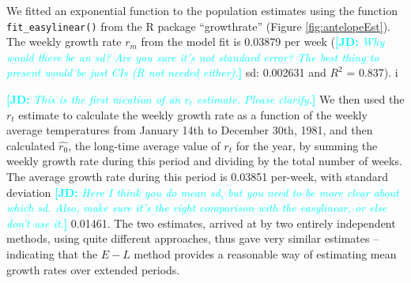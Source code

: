 \documentclass[12pt,a4paper]{article}
\newcommand{\comment}[3]{\textcolor{#1}{\textbf{[#2: }\textsl{#3}\textbf{]}}}
\newcommand{\jd}[1]{\comment{cyan}{JD}{#1}}
\begin{document}
We fitted an exponential function to the population estimates using the function \texttt{fit\_easylinear()} from the R package “growthrate” (Figure \ref{fig:antelopeEst}). The weekly growth rate $r_m$ from the model fit is 0.03879 per week (\jd{Why would there be an sd? Are you sure it's not standard error? The best thing to present would be just CIs (R not needed either).} sd: 0.002631 and $R^2$ = 0.837). i

\jd{This is the first mention of an $r_t$ estimate. Please clarify.}
We then used the $r_t$ estimate to calculate the weekly growth rate as a function of the weekly average temperatures from January 14th to December 30th, 1981, and then calculated $\hat{r_0}$, the long-time average value of $r_t$ for the year, by summing the weekly growth rate during this period and dividing by the total number of weeks. The average growth rate during this period is 0.03851 per-week, with standard deviation \jd{Here I think you do mean sd, but you need to be more clear about which sd. Also, make sure it's the right comparison with the easylinear, or else don't use it.} 0.01461. The two estimates, arrived at by two entirely independent methods, using quite different approaches, thus gave very similar estimates – indicating that the $E-L$ method provides a reasonable way of estimating mean  growth rates over extended periods.
\end{document}
